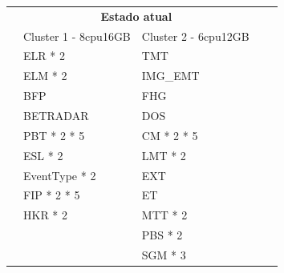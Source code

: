 \begin{table}[H]
  \centering
  \begin{tabular}{|l|l|l|l|l|}
    \cellcolor{white} & \multicolumn{2}{|c|}{\cellcolor[HTML]{FBE6A3}\textbf{Estado atual}}                              \\ \cline{1-4} 
    & \cellcolor[HTML]{4EAC5B}Cluster 1 - 8cpu16GB          & \cellcolor[HTML]{4EAC5B}Cluster 2 - 6cpu12GB          &                            \\ \cline{1-4} 
    & \cellcolor[HTML]{A9D08E}ELR * 2                       & \cellcolor[HTML]{BDD7EE}TMT                           &                            \\ \cline{1-4} 
    & \cellcolor[HTML]{A9D08E}ELM * 2                       & \cellcolor[HTML]{BDD7EE}IMG\_EMT                      &                            \\ \cline{1-4} 
    & \cellcolor[HTML]{A9D08E}BFP                           & \cellcolor[HTML]{BDD7EE}FHG                           &                            \\ \cline{1-4} 
    & \cellcolor[HTML]{A9D08E}BETRADAR                      & \cellcolor[HTML]{BDD7EE}DOS                           &                            \\ \cline{1-4} 
    & \cellcolor[HTML]{A9D08E}PBT * 2 * 5                   & \cellcolor[HTML]{BDD7EE}CM * 2 * 5                    &                            \\ \cline{1-4} 
    & \cellcolor[HTML]{A9D08E}ESL * 2                       & \cellcolor[HTML]{BDD7EE}LMT * 2                       &                            \\ \cline{1-4} 
    & \cellcolor[HTML]{A9D08E}EventType * 2                 & \cellcolor[HTML]{BDD7EE}EXT                           &                            \\ \cline{1-4} 
    & \cellcolor[HTML]{A9D08E}FIP * 2 * 5                   & \cellcolor[HTML]{BDD7EE}ET                            &                            \\ \cline{1-4} 
    & \cellcolor[HTML]{A9D08E}HKR * 2                       & \cellcolor[HTML]{BDD7EE}MTT * 2                       &                            \\ \cline{1-4} 
    &                                                       & \cellcolor[HTML]{BDD7EE}PBS * 2                       &                            \\ \cline{1-4} 
    &                                                       & \cellcolor[HTML]{BDD7EE}SGM * 3                       &                            \\ \cline{1-4} 

\end{tabular}
\end{table}
